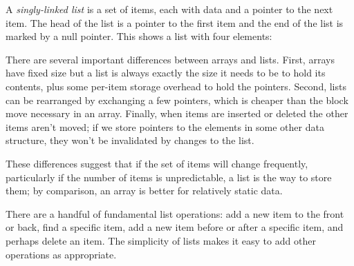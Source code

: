 A \emph{singly-linked list} is a set of items, each with data
and a pointer to the next item. The head of the list is a pointer to the
first item and the end of the list is marked by a null pointer. This shows
a list with four elements:
\begin{center}
\end{center}
There are several important differences between arrays and lists. First,
arrays have fixed size but a list is always exactly the size it needs to be
to hold its contents, plus some per-item storage overhead to hold the
pointers. Second, lists can be rearranged by exchanging a few pointers,
which is cheaper than the block move necessary in an array. Finally, when
items are inserted or deleted the other items aren't moved; if we store
pointers to the elements in some other data structure, they won't be
invalidated by changes to the list.

These differences suggest that if the set of items will change frequently,
particularly if the number of items is unpredictable, a list is the way to
store them; by comparison, an array is better for relatively static data.

There are a handful of fundamental list operations: add a new item to the
front or back, find a specific item, add a new item before or after a
specific item, and perhaps delete an item. The simplicity of lists makes it
easy to add other operations as appropriate.

